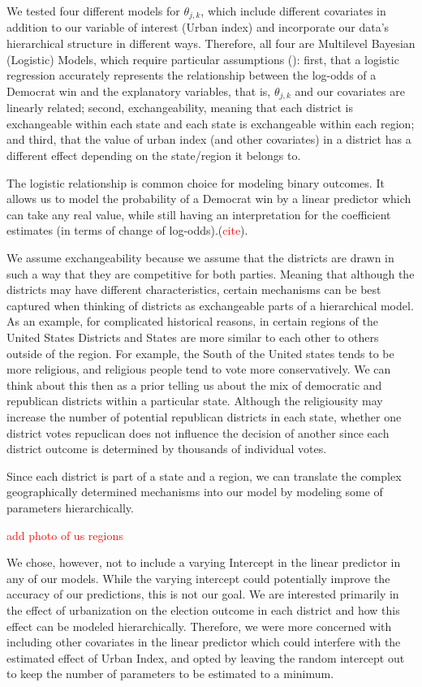 \documentclass[12pt]{article}
\newcommand{\red}[1]{\textcolor{red}{#1}}
\begin{document}
We tested four different models for $\theta_{j,k}$, which include different covariates in addition to our variable of interest (Urban index) and incorporate our data's hierarchical structure in different ways. Therefore, all four are Multilevel Bayesian (Logistic) Models, which require particular assumptions (\cite{BDA}): 
first, that a logistic regression accurately represents the relationship between the log-odds of a Democrat win and the explanatory variables, that is, $\theta_{j,k}$ and our covariates are linearly related; second, exchangeability, meaning that each district is exchangeable within each state and each state is exchangeable within each region; and third, that the value of urban index (and other covariates) in a district has a different effect depending on the state/region it belongs to.


The logistic relationship is common choice for modeling binary outcomes. It allows us to model the probability of a Democrat win by a linear predictor which can take any real value, while still having an interpretation for the coefficient estimates (in terms of change of log-odds).(\textcolor{red}{cite}).


We assume exchangeability because we assume that the districts are drawn in such a way that they are competitive for both parties. Meaning that although the districts may have different characteristics, certain mechanisms can be best captured when thinking of districts as exchangeable parts of  a hierarchical model. 
As an example, for complicated historical reasons, in certain regions of the United States Districts and States are more similar to each other to others outside of the region. For example, the South of the United states tends to be more religious, and religious people tend to vote more conservatively. We can think about this then as a prior telling us about the mix of democratic and republican districts within a particular state. Although the religiousity may increase the number of potential republican districts in each state, whether one district votes repuclican does not influence the decision of another since each district outcome is determined by thousands of individual votes. 

Since each district is part of a state and a region, we can translate the complex geographically determined mechanisms into our model by modeling some of parameters hierarchically.

\red{add photo of us regions }

We chose, however, not to include a varying Intercept in the linear predictor in any of our models. While the varying intercept could potentially improve the accuracy of our predictions, this is not our goal. We are interested primarily in the effect of urbanization on the election outcome in each district and how this effect can be modeled hierarchically. Therefore, we were more concerned with including other covariates in the linear predictor which could interfere with the estimated effect of Urban Index, and opted by leaving the random intercept out to keep the number of parameters to be estimated to a minimum.
\end{document}
